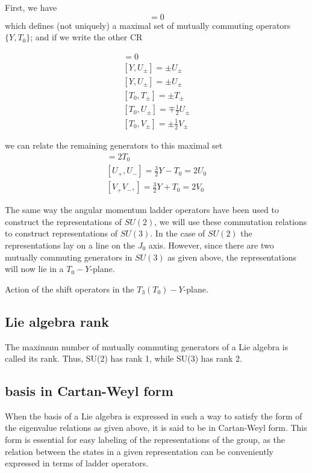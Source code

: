 \documentclass[main.tex]{subfiles}
\begin{document}
First, we have
\begin{equation*}
[Y,T_0]=0
\end{equation*}
 which defines (not uniquely) a maximal set of mutually commuting operators $\{Y, T_0\}$; and if  we write the other CR


\begin{align*}
[Y,T_{\pm}]=0\\
[Y,U_{\pm}]=\pm U_{\pm}\\
[Y,U_{\pm}]=\pm U_{\pm}\\
[T_0,T_{\pm}]=\pm T_{\pm}\\
[T_0,U_{\pm}]=\mp\frac{1}{2}U_{\pm}\\
[T_0,V_{\pm}]=\pm\frac{1}{2}V_{\pm}
\end{align*}

we can relate the remaining generators to this maximal set
\begin{align*}
[T_+,T_-]=2T_0\\
[U_+,U_-]=\frac{3}{2}Y-T_0=2U_0\\
[V_+V_-,]=\frac{3}{2}Y+T_0=2V_0
\end{align*}

The same way the angular momentum ladder operators have been used to construct the representations of $SU(2)$, we will use these commutation relations to construct representations of $SU(3)$. In the case of $SU(2)$ the representations lay on a line on the $J_0$ axis. However, since there are two mutually commuting generators in $SU(3)$ as given above, the representations will now lie in a $T_0-Y$-plane.

Action of the shift operators in the $T_3(T_0)-Y$-plane.

\subsection{Lie algebra rank}
The maximum number of mutually commuting generators of a Lie algebra is called its rank. Thus, SU(2) has rank 1, while SU(3) has rank 2.

\subsection{basis in Cartan-Weyl form}
When the basis of a Lie algebra is expressed in such a way to satisfy the form of the eigenvalue relations as given above, it is said to be in Cartan-Weyl form. This form is essential for easy labeling of the representations of the group, as the relation between the states in a given representation can be conveniently expressed in terms of ladder operators.
\end{document}
